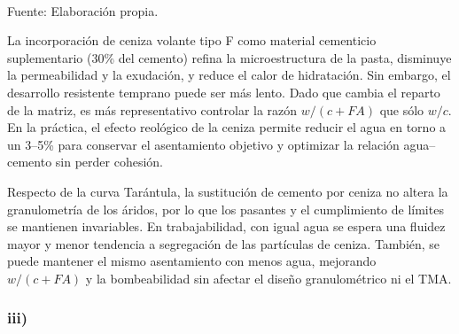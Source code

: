 \begin{table}[H]
\centering
\caption{Dosificación comparativa con y sin ceniza volante tipo F (valores corregidos por rendimiento).}
\label{tab:comp-dosificacion-fa}
\setlength{\tabcolsep}{6pt}
\renewcommand{\arraystretch}{1.15}
\small
{}
\\Fuente: Elaboración propia.
\end{table}

La incorporación de ceniza volante tipo F como material cementicio suplementario (30\% del cemento) refina la microestructura de la pasta, disminuye la permeabilidad y la exudación, y reduce el calor de hidratación. Sin embargo, el desarrollo resistente temprano puede ser más lento. Dado que cambia el reparto de la matriz, es más representativo controlar la razón $w/(c+FA)$ que sólo $w/c$. En la práctica, el efecto reológico de la ceniza permite reducir el agua en torno a un 3–5\% para conservar el asentamiento objetivo y optimizar la relación agua–cemento sin perder cohesión.

Respecto de la curva Tarántula, la sustitución de cemento por ceniza no altera la granulometría de los áridos, por lo que los pasantes y el cumplimiento de límites se mantienen invariables. En trabajabilidad, con igual agua se espera una fluidez mayor y menor tendencia a segregación de las partículas de ceniza. También, se puede mantener el mismo asentamiento con menos agua, mejorando $w/(c+FA)$ y la bombeabilidad sin afectar el diseño granulométrico ni el TMA.


\subsubsection*{iii)}

